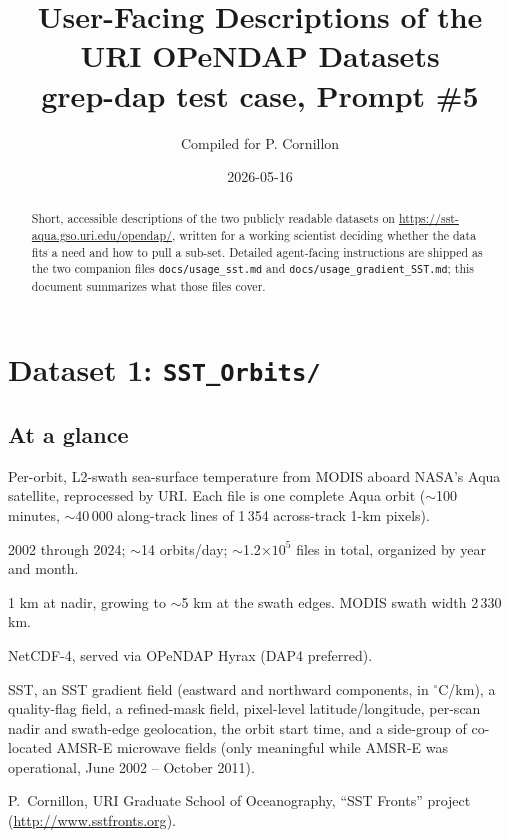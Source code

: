 \documentclass[11pt]{article}
\title{User-Facing Descriptions of the URI OPeNDAP Datasets\\
       \large grep-dap test case, Prompt \#5}
\author{Compiled for P. Cornillon}
\date{2026-05-16}
\begin{document}
\maketitle

\begin{abstract}
Short, accessible descriptions of the two publicly readable
datasets on \url{https://sst-aqua.gso.uri.edu/opendap/}, written
for a working scientist deciding whether the data fits a need and
how to pull a sub-set. Detailed agent-facing instructions are
shipped as the two companion files
\texttt{docs/usage\_sst.md} and
\texttt{docs/usage\_gradient\_SST.md}; this document summarizes
what those files cover.
\end{abstract}

\tableofcontents

\section{Dataset 1: \texttt{SST\_Orbits/}}\label{sec:ds1}

\subsection{At a glance}

\begin{description}[leftmargin=2em,style=nextline,topsep=2pt]
  \item[What it is.]
    Per-orbit, L2-swath sea-surface temperature from MODIS aboard
    NASA's Aqua satellite, reprocessed by URI. Each file is one
    complete Aqua orbit ($\sim$100 minutes, $\sim$40\,000
    along-track lines of 1\,354 across-track 1-km pixels).
  \item[Coverage.]
    2002 through 2024; $\sim$14 orbits/day; $\sim$1.2$\times 10^5$
    files in total, organized by year and month.
  \item[Native resolution.] 1 km at nadir, growing to $\sim$5 km at
    the swath edges. MODIS swath width 2\,330 km.
  \item[Format.] NetCDF-4, served via OPeNDAP Hyrax (DAP4 preferred).
  \item[What you get per file.] SST, an SST gradient field (eastward
    and northward components, in $^\circ$C/km), a quality-flag field,
    a refined-mask field, pixel-level latitude/longitude, per-scan
    nadir and swath-edge geolocation, the orbit start time, and a
    side-group of co-located AMSR-E microwave fields (only meaningful
    while AMSR-E was operational, June 2002 -- October 2011).
  \item[Producer.]
    P.\ Cornillon, URI Graduate School of Oceanography, ``SST Fronts''
    project (\url{http://www.sstfronts.org}).
\end{description}
\end{document}
